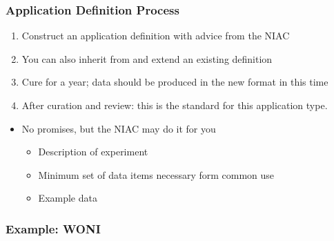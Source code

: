 \documentclass{beamer}
\begin{document}
\begin{frame} \frametitle{Application Definition Process}
\begin{enumerate}
\item Construct an application definition with advice from the NIAC
\item You can also inherit from and extend an existing definition
\item Cure for a year; data should be produced in the new format in this time
\item After curation and review: this is the standard for this application type.
\end{enumerate}
\begin{itemize}
\item No promises, but the NIAC may do it for you
\begin{itemize}
\item Description of experiment
\item Minimum set of data items necessary form common use
\item Example data
\end{itemize}
\end{itemize}

\end{frame}



\begin{frame} \frametitle{Example: WONI}
\begin{figure}[!ht]
\end{figure}
\end{frame}
\end{document}
